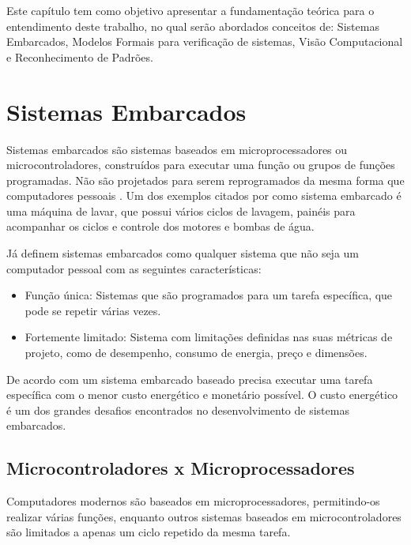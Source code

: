 \label{chap:fund_teo}
	Este capítulo tem como objetivo apresentar a fundamentação teórica para o entendimento deste trabalho, no qual serão abordados conceitos de: Sistemas Embarcados, Modelos Formais para verificação de sistemas, Visão Computacional e Reconhecimento de Padrões.
  
    
\section{Sistemas Embarcados} 
Sistemas embarcados são sistemas baseados em microprocessadores ou microcontroladores, construídos para executar uma função ou grupos de funções programadas. Não são projetados para serem reprogramados da mesma forma que computadores pessoais \cite{heath:2002}.
Um dos exemplos citados por \cite{heath:2002} como sistema embarcado é uma máquina de lavar, que possui vários ciclos de lavagem, painéis para acompanhar os ciclos e controle dos motores e bombas de água.
    
Já  definem sistemas embarcados como qualquer sistema que não seja um computador pessoal com as seguintes características:\begin{itemize}
\item Função única: Sistemas que são programados para um tarefa específica, que pode se repetir várias vezes.
\item Fortemente limitado: Sistema com limitações definidas nas suas métricas de projeto, como de desempenho, consumo de energia, preço e dimensões.
\end{itemize}

De acordo com   um sistema embarcado baseado precisa executar uma tarefa específica com o menor custo energético e monetário possível. O custo energético é um dos grandes desafios encontrados no desenvolvimento de sistemas embarcados.
 

\subsection{Microcontroladores x Microprocessadores}
 Computadores modernos são baseados em microprocessadores, permitindo-os realizar várias funções, enquanto outros sistemas baseados em microcontroladores são limitados a apenas um ciclo repetido da mesma tarefa.\cite{heath:2002}

